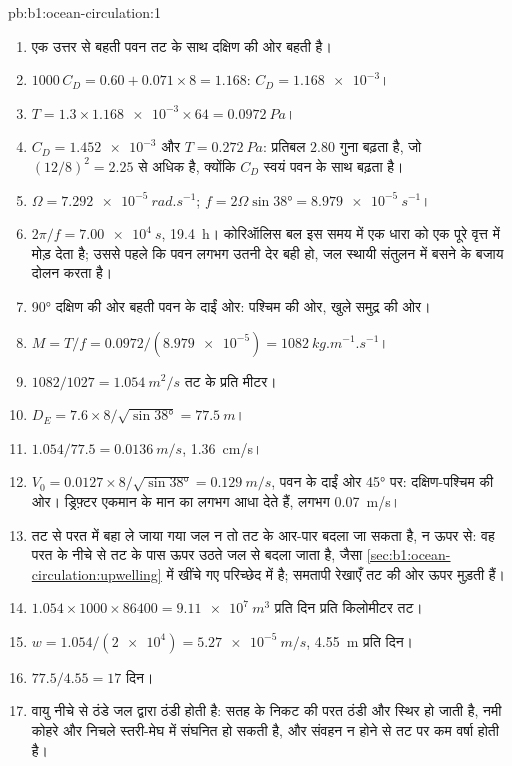 \begin{solution}{pb:b1:ocean-circulation:1}
\begin{enumerate}
  \item एक उत्तर से बहती पवन तट के साथ दक्षिण की ओर बहती है।
  \item $1000\,C_D = 0.60 + 0.071 \times 8 = 1.168$: $C_D = \num{1.168e-3}$।
  \item $T = 1.3 \times \num{1.168e-3} \times 64 = \qty{0.0972}{Pa}$।
  \item $C_D = \num{1.452e-3}$ और $T = \qty{0.272}{Pa}$: प्रतिबल $2.80$ गुना बढ़ता है,
        जो $(12/8)^2 = 2.25$ से अधिक है, क्योंकि $C_D$ स्वयं पवन के साथ बढ़ता है।
  \item $\Omega = \qty{7.292e-5}{rad.s^{-1}}$; $f = 2\Omega\sin\ang{38} =
        \qty{8.979e-5}{s^{-1}}$।
  \item $2\pi/f = \qty{7.00e4}{s}$, \qty{19.4}{h}। कोरिऑलिस बल इस समय में एक धारा को एक पूरे वृत्त में मोड़ देता है; उससे पहले कि पवन लगभग उतनी देर बही हो, जल स्थायी संतुलन में बसने के बजाय दोलन करता है।
  \item \ang{90} दक्षिण की ओर बहती पवन के दाईं ओर: पश्चिम की ओर, खुले समुद्र की ओर।
  \item $M = T/f = 0.0972/(\num{8.979e-5}) = \qty{1082}{kg.m^{-1}.s^{-1}}$।
  \item $1082/1027 = \qty{1.054}{m^2/s}$ तट के प्रति मीटर।
  \item $D_E = 7.6 \times 8/\sqrt{\sin\ang{38}} = \qty{77.5}{m}$।
  \item $1.054/77.5 = \qty{0.0136}{m/s}$, \qty{1.36}{cm/s}।
  \item $V_0 = 0.0127 \times 8/\sqrt{\sin\ang{38}} = \qty{0.129}{m/s}$, पवन के दाईं ओर \ang{45} पर: दक्षिण-पश्चिम की ओर। ड्रिफ़्टर एकमान के मान का लगभग आधा देते हैं, लगभग \qty{0.07}{m/s}।
  \item तट से परत में बहा ले जाया गया जल न तो तट के आर-पार बदला जा सकता है, न ऊपर से: वह परत के नीचे से तट के पास ऊपर उठते जल से बदला जाता है, जैसा \cref{sec:b1:ocean-circulation:upwelling} में खींचे गए परिच्छेद में है; समतापी रेखाएँ तट की ओर ऊपर मुड़ती हैं।
  \item $1.054 \times 1000 \times 86400 = \qty{9.11e7}{m^3}$ प्रति दिन प्रति किलोमीटर तट।
  \item $w = 1.054/(\num{2e4}) = \qty{5.27e-5}{m/s}$, \qty{4.55}{m} प्रति दिन।
  \item $77.5/4.55 = 17$ दिन।
  \item वायु नीचे से ठंडे जल द्वारा ठंडी होती है: सतह के निकट की परत ठंडी और स्थिर हो जाती है, नमी कोहरे और निचले स्तरी-मेघ में संघनित हो सकती है, और संवहन न होने से तट पर कम वर्षा होती है।

\end{enumerate}
\end{solution}
